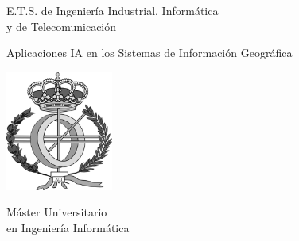 \def\changemargin#1#2{\list{}{\rightmargin#2\leftmargin#1}\item[]}
\let\endchangemargin=\endlist

\pagecolor[gray]{0.9}

\begin{tcolorbox}[
    colback=black, coltext=white, fontupper=\LARGE,
    height=3.77cm, halign=center, valign=center,
    boxrule=0pt, arc=0pt, outer arc=0pt
]
E.T.S. de Ingeniería Industrial, Informática \\ y de Telecomunicación
\end{tcolorbox}

\vspace{1.5cm}
\begin{changemargin}{0.75cm}{0.75cm}
\begin{center}
\huge
Aplicaciones IA en los Sistemas de Información Geográfica
\end{center}
\end{changemargin}

\vspace{1cm}
\begin{center}
    \includegraphics[width=3.53cm]{Imagenes/portada/Portada_Imagen.png}
    
    \vfill
    \Large
    Máster Universitario \\
    en Ingeniería Informática
\end{center}

